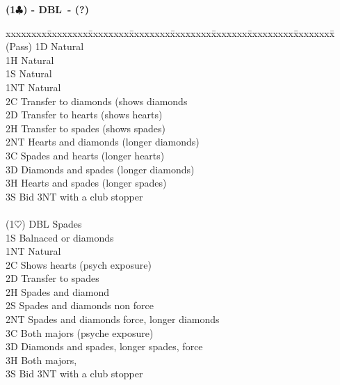 \documentclass[10pt]{article}
\renewcommand{\c}{$\clubsuit$}
\newcommand{\h}{$\heartsuit$}
\newcommand{\x}{DBL}
\newenvironment{bidtable}[1][]
{\textbf{#1}
  \begin{adjustwidth}{1em}{}
    \addvspace{2pt}
    \begin{tabbing}
      xxxxxxxx\=xxxxxxxx\=xxxxxxxx\=xxxxxxxx\=xxxxxxxx\=xxxxxxx\=xxxxxxxxx\=xxxxxxxx\=\kill}
{\end{tabbing}\end{adjustwidth}\bigskip}%
\begin{document}
\begin{bidtable}[(1\c) - \x\ - (?)]
(Pass) \> 1D    \> Natural                                    \\
       \> 1H    \> Natural                                    \\
       \> 1S    \> Natural                                    \\
       \> 1NT   \> Natural                                    \\
       \> 2C    \> Transfer to diamonds (shows diamonds       \\
       \> 2D    \> Transfer to hearts (shows hearts)          \\
       \> 2H    \> Transfer to spades (shows spades)          \\
       \> 2NT   \> Hearts and diamonds (longer diamonds)      \\
       \> 3C    \> Spades and hearts (longer hearts)          \\
       \> 3D    \> Diamonds and spades (longer diamonds)      \\
       \> 3H    \> Hearts and spades (longer spades)          \\
       \> 3S    \> Bid 3NT with a club stopper                \\
                                                              \\
(1\h)  \> DBL   \> Spades                                     \\
       \> 1S    \> Balnaced or diamonds                       \\
       \> 1NT   \> Natural                                    \\
       \> 2C    \> Shows hearts (psych exposure)              \\
       \> 2D    \> Transfer to spades                         \\
       \> 2H    \> Spades and diamond                         \\
       \> 2S    \> Spades and diamonds non force              \\
       \> 2NT   \> Spades and diamonds force, longer diamonds \\
       \> 3C    \> Both majors (psyche exposure)              \\
       \> 3D    \> Diamonds and spades, longer spades, force  \\
       \> 3H    \> Both majors,                               \\
       \> 3S    \> Bid 3NT with a club stopper                \\

\end{bidtable}
\end{document}
